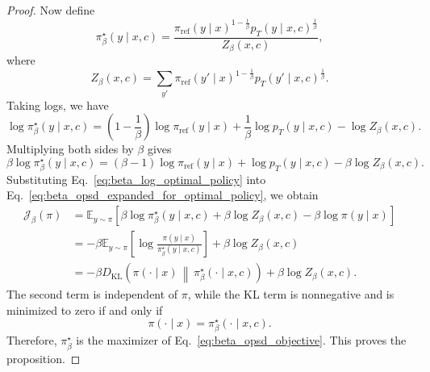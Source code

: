 \begin{proof}
Now define
\begin{equation}
    \pi_{\beta}^{\star}(y\mid x,c)
    =
    \frac{
    \pi_{\mathrm{ref}}(y\mid x)^{1-\frac{1}{\beta}}
    p_T(y\mid x,c)^{\frac{1}{\beta}}
    }{
    Z_{\beta}(x,c)
    },
\end{equation}
where
\begin{equation}
    Z_{\beta}(x,c)
    =
    \sum_{y'}
    \pi_{\mathrm{ref}}(y'\mid x)^{1-\frac{1}{\beta}}
    p_T(y'\mid x,c)^{\frac{1}{\beta}}.
\end{equation}
Taking logs, we have
\begin{equation}
    \log \pi_{\beta}^{\star}(y\mid x,c)
    =
    \left(1-\frac{1}{\beta}\right)
    \log \pi_{\mathrm{ref}}(y\mid x)
    +
    \frac{1}{\beta}
    \log p_T(y\mid x,c)
    -
    \log Z_{\beta}(x,c).
\end{equation}
Multiplying both sides by $\beta$ gives
\begin{equation}
    \beta \log \pi_{\beta}^{\star}(y\mid x,c)
    =
    (\beta-1)
    \log \pi_{\mathrm{ref}}(y\mid x)
    +
    \log p_T(y\mid x,c)
    -
    \beta \log Z_{\beta}(x,c).
    \label{eq:beta_log_optimal_policy}
\end{equation}
Substituting Eq.~\ref{eq:beta_log_optimal_policy} into
Eq.~\ref{eq:beta_opsd_expanded_for_optimal_policy}, we obtain
\begin{align}
    \mathcal{J}_{\beta}(\pi)
    &=
    \mathbb{E}_{y\sim\pi}
    \left[
    \beta \log \pi_{\beta}^{\star}(y\mid x,c)
    +
    \beta \log Z_{\beta}(x,c)
    -
    \beta \log \pi(y\mid x)
    \right] \\
    &=
    -\beta
    \mathbb{E}_{y\sim\pi}
    \left[
    \log
    \frac{
    \pi(y\mid x)
    }{
    \pi_{\beta}^{\star}(y\mid x,c)
    }
    \right]
    +
    \beta \log Z_{\beta}(x,c) \\
    &=
    -\beta
    D_{\mathrm{KL}}
    \left(
    \pi(\cdot\mid x)
    \,\middle\|\,
    \pi_{\beta}^{\star}(\cdot\mid x,c)
    \right)
    +
    \beta \log Z_{\beta}(x,c).
    \label{eq:beta_opsd_as_negative_kl}
\end{align}
The second term is independent of $\pi$, while the KL term is nonnegative and is minimized
to zero if and only if
\begin{equation}
    \pi(\cdot\mid x)
    =
    \pi_{\beta}^{\star}(\cdot\mid x,c).
\end{equation}
Therefore, $\pi_{\beta}^{\star}$ is the maximizer of
Eq.~\ref{eq:beta_opsd_objective}. This proves the proposition.
\end{proof}


